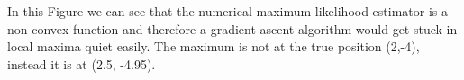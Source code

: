 In this Figure we can see that the numerical maximum likelihood estimator is a non-convex function and therefore a gradient ascent algorithm would get stuck in local maxima quiet easily. 
The maximum is not at the true position (2,-4), instead it is at (2.5, -4.95).

% 
% 



\FloatBarrier\label{end-of-document}


